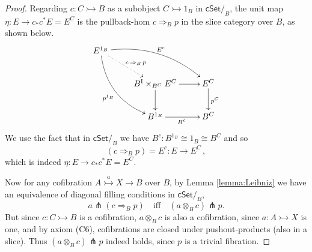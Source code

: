 \documentclass[11pt,reqno]{amsart}
\newcommand{\cSet}{\ensuremath{\mathsf{cSet}}}
\newcommand{\mono}{\ensuremath{\rightarrowtail}}
\newcommand{\ra}{\ensuremath{\rightarrow}}
\newcommand{\cof}{\ensuremath{\rightarrowtail}}
\renewcommand{\to}{\ensuremath{\rightarrow}}
\newcommand{\too}{\ensuremath{\longrightarrow}}
\newcommand{\I}{\ensuremath{\mathrm{I}}}
\theoremstyle{remark}
\theoremstyle{definition}
\begin{document}
\begin{proof}
Regarding $c : C \cof B$ as a subobject $C\cof 1_B$ in $\cSet/_B$, the unit map $\eta : E \ra c_*c^*E = E^C$ is the pullback-hom $c\!\Rightarrow_B\! p$ in the slice category over $B$, as shown below.
\begin{equation}\label{diagram:etaispghom}
\xymatrix{
E^{1_B} \ar@/_4ex/ [rdd]_{p^{1_B}} \ar@{.>}[rd]^{c\, \Rightarrow_B\, {p}} \ar@/^4ex/ [rrd]^{E^c} && \\
& B^\I \times_{B^C} E^C \ar[d] \ar[r] & E^C \ar[d]^{p^C} \\
& B^{1_B} \ar[r]_{B^c} &  B^C 
}
\end{equation}
We use the fact that in $\cSet/_B$ we have $B^c : B^{1_B} \cong 1_B \cong B^C$ and so
\[
(c\Rightarrow_B p) = E^c : E \too E^C\,,
\]
which is indeed $\eta : E \ra c_*c^*E = E^C$.

Now for any cofibration $A \stackrel{a}{\cof} X\to B$ over $B$, by Lemma \ref{lemma:Leibniz} we have an equivalence of diagonal filling conditions in $\cSet/_B$,
\[
a \pitchfork (c\!\Rightarrow_B\!p)  \quad\text{iff}\quad (a\!\otimes_B\!c) \pitchfork p.
\]
But since $c : C\mono B$ is a cofibration, $a\otimes_B c$ is also a cofibration, since $a : A \cof X$ is one, and by axiom (C6), cofibrations are closed under pushout-products (also in a slice).  Thus $(a\otimes_B c) \pitchfork p$ indeed holds, since $p$ is a trivial fibration.
\end{proof}
\end{document}
